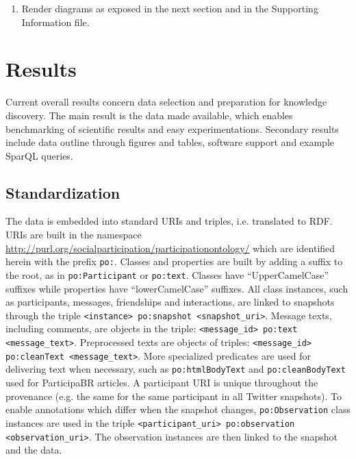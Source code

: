 \documentclass[review]{elsarticle}
\newcommand{\textttt}[1] {\texttt{\footnotesize#1}}
\begin{document}
\begin{enumerate}[leftmargin=0cm]
\item Render diagrams as exposed in the next section and in the Supporting Information file.
\end{enumerate}
 
\section{Results}
\label{outline}
Current overall results concern data selection and preparation for knowledge discovery.
The main result is the data made available, which enables benchmarking of scientific results
and easy experimentations.
Secondary results include data outline through figures and tables,
software support and example SparQL queries.

\subsection{Standardization}
The data is embedded into standard URIs and triples, i.e. translated to RDF.
URIs are built in the namespace \url{http://purl.org/socialparticipation/participationontology/}
which are identified herein with the prefix \textttt{po:}.
Classes and properties are built by adding a suffix to the root, as in \textttt{po:Participant} or \textttt{po:text}.
Classes have ``UpperCamelCase'' suffixes while properties have ``lowerCamelCase'' suffixes.
All class instances, such as participants, messages, friendships and
interactions, are linked to
snapshots through the triple \textttt{<instance> po:snapshot <snapshot\_uri>}.
Message texts, including comments, are objects in the triple: \textttt{<message\_id> po:text <message\_text>}.
Preprocessed texts are objects of triples: \textttt{<message\_id> po:cleanText <message\_text>}.
More specialized predicates are used for delivering text when necessary,
such as \textttt{po:htmlBodyText} and \textttt{po:cleanBodyText} used
for ParticipaBR articles.
A participant URI is unique throughout the provenance (e.g. the same for
the same participant in all Twitter snapshots).
To enable annotations which differ when the snapshot changes,
\texttt{po:Observation} class instances are used in the triple
\textttt{<participant\_uri> po:observation <observation\_uri>}.
The observation instances are then linked to the snapshot and the
data.
\end{document}
